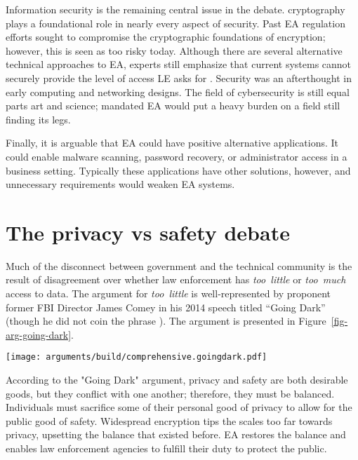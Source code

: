 \documentclass{IEEEtran}
\def\ii#1{\mbox{\textit{#1}}}
\newcommand{\myfig}[1]{Figure~\ref{#1}}
\begin{document}
Information security is the remaining central issue in the debate. \ac{cryptography}
plays a foundational role in nearly every aspect of security. Past \ac{EA} regulation efforts sought to compromise the
cryptographic foundations of encryption; however, this is seen as too risky today. Although there are several alternative technical approaches to \ac{EA}, experts still emphasize that current systems cannot securely provide
the level of access \acl{LE} asks for \cite{abelson_2015} \cite{abelson_risks_1997}. Security was an afterthought in
early computing and networking designs. The field of cybersecurity is still equal parts art and science; mandated
\ac{EA} would put a heavy burden on a field still finding its legs.

Finally, it is arguable that \ac{EA} could have positive alternative applications. It could enable malware scanning,
password recovery, or administrator access in a business setting. Typically these applications have other solutions,
however, and unnecessary requirements would weaken \ac{EA} systems.


\section{The privacy vs safety debate}

Much of the disconnect between government and the technical community is the result of disagreement over whether law
enforcement has \ii{too little} or \ii{too much} access to data. The argument for \ii{too little} is well-represented by
proponent former \ac{FBI} Director James Comey in his 2014 speech titled ``Going Dark'' \cite{comey_2014} (though he did
not coin the phrase \cite{swire_encryption_2011}). The argument is presented in \myfig{fig-arg-going-dark}.

\begin{figure*}[t!]
  \centering
  \texttt{[image: arguments/build/comprehensive.goingdark.pdf]}
  \caption{A ``Going Dark'' Argument Map}
  \label{fig-arg-going-dark}
\end{figure*}

According to the "Going Dark" argument, privacy and safety are both desirable goods, but they conflict with one another;
therefore, they must be balanced. Individuals must sacrifice some of their personal good of privacy to allow for the
public good of safety. Widespread encryption tips the scales too far towards privacy, upsetting the balance that existed
before. \ac{EA} restores the balance and enables law enforcement agencies to fulfill their duty to protect the public.
\end{document}
